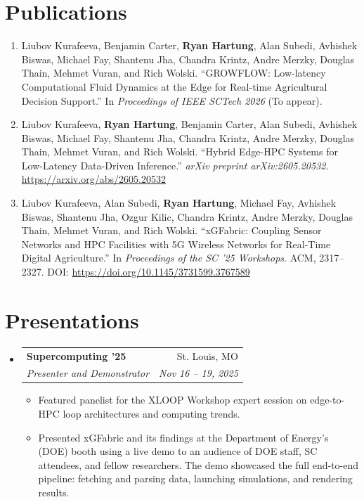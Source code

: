 \documentclass[letterpaper,11pt]{article}
\makeatletter
\newcommand{\resumeSubheading}[4]{
  \vspace{-2pt}
\item
  \begin{tabular*}{\textwidth}[t]{l@{\extracolsep{\fill}}r}
    \textbf{#1} & #2 \\
    \small\textit{#3} & \small \textit{#4} \\
  \end{tabular*}\vspace{-7pt}
}
\newcommand{\resumeSubHeadingListStart}{
\begin{itemize}[leftmargin=0in, label={}]}
\newcommand{\resumeSubHeadingListEnd}{
\end{itemize}\vspace{-5pt}}
\makeatother
\begin{document}
\section{Publications}
\begin{small}
  \begin{enumerate}[align=left, itemindent=0pt]
    \item[{[2026]}] Liubov Kurafeeva, Benjamin Carter, \textbf{Ryan Hartung}, Alan Subedi, Avhishek Biswas, Michael Fay, Shantenu Jha, Chandra Krintz, Andre Merzky, Douglas Thain, Mehmet Vuran, and Rich Wolski. ``GROWFLOW: Low-latency Computational Fluid Dynamics at the Edge for Real-time Agricultural Decision Support.'' In \textit{Proceedings of IEEE SCTech 2026} (To appear).
    \item[{[2026]}] Liubov Kurafeeva, \textbf{Ryan Hartung}, Benjamin Carter, Alan Subedi, Avhishek Biswas, Michael Fay, Shantenu Jha, Chandra Krintz, Andre Merzky, Douglas Thain, Mehmet Vuran, and Rich Wolski. ``Hybrid Edge-HPC Systems for Low-Latency Data-Driven Inference.'' \textit{arXiv preprint arXiv:2605.20532}. \url{https://arxiv.org/abs/2605.20532}
    \item[{[2025]}] Liubov Kurafeeva, Alan Subedi, \textbf{Ryan Hartung}, Michael Fay, Avhishek Biswas, Shantenu Jha, Ozgur Kilic, Chandra Krintz, Andre Merzky, Douglas Thain, Mehmet Vuran, and Rich Wolski. ``xGFabric: Coupling Sensor Networks and HPC Facilities with 5G Wireless Networks for Real-Time Digital Agriculture.'' In \textit{Proceedings of the SC '25 Workshops}. ACM, 2317--2327. DOI: \url{https://doi.org/10.1145/3731599.3767589}
  \end{enumerate}
\end{small}

\section{Presentations}
\resumeSubHeadingListStart
\resumeSubheading
{Supercomputing '25}{St. Louis, MO}
{Presenter and Demonstrator}{Nov 16 -- 19, 2025}\vspace*{-5pt}
\begin{small}
  \begin{itemize}[itemindent=0pt]
    \item Featured panelist for the XLOOP Workshop expert session on edge-to-HPC loop architectures and computing trends.
    \item Presented xGFabric and its findings at the Department of Energy's (DOE) booth using a live demo to an audience of DOE staff, SC attendees, and fellow researchers. The demo showcased the full end-to-end pipeline: fetching and parsing data, launching simulations, and rendering results.
  \end{itemize}
\end{small}\vspace*{-1em}
\resumeSubHeadingListEnd
\end{document}
